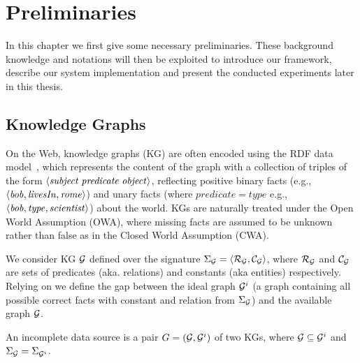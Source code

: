 
\chapter{Preliminaries}\label{sec:prelim}
In this chapter we first give some necessary preliminaries. These background knowledge and notations will then be exploited to introduce our framework, describe our system implementation and present the conducted experiments later in this thesis.

\section{Knowledge Graphs} On the Web, knowledge graphs (KG) are often encoded using the RDF data
model~\cite{rdf}, which represents the content of the graph with a collection of
triples of the form $\langle\mathit{subject}\;\mathit{predicate}\;\mathit{object}\rangle$, reflecting positive binary facts (e.g., $\langle\mathit{bob,livesIn,rome}\rangle$) and unary facts (where $predicate = type$ e.g., $\mathit{\langle bob,type,scientist\rangle}$) about the world. KGs are naturally treated under the Open World Assumption (OWA), where missing facts are assumed to be unknown rather than false as in the Closed World Assumption (CWA).  %

We %
consider KG $\mathcal{G}$ defined over the signature
$\Sigma_{\mathcal{G}}=\langle\mathcal{R}_{\mathcal{G}},\mathcal{C}_{\mathcal{G}}\rangle$, where $\mathcal{R}_{\mathcal{G}}$ and $\mathcal{C}_{\mathcal{G}}$ are sets of
predicates (aka. relations) and constants (aka entities) respectively. 
Relying on \cite{DBLP:conf/semweb/DarariNPR13} we define the gap between the ideal graph %
$\mathcal{G}^i$ (a graph containing all possible correct facts with constant and relation from $\Sigma_{\mathcal{G}}$) and the available graph $\mathcal{G}$. 

\begin{definition} An incomplete data source is a pair
    $G = (\mathcal{G}, \mathcal{G}^i)$ of two KGs, where $\mathcal{G}\subseteq \mathcal{G}^i$ and
    $\Sigma_{\mathcal{G}}=\Sigma_{\mathcal{G}^i}$. 
\end{definition}

